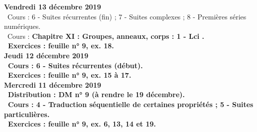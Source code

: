 \documentclass[12pt,a4paper]{article}
\begin{document}
%  
%  
%  
% 
% 
%  
% 

\noindent\textbf{Vendredi 13 décembre 2019}\\
\bu\ Cours : 6 - Suites récurrentes (fin) ; 7 - Suites complexes ; 8 - Premières séries numériques.\\
\bu\ Cours : \bf Chapitre XI \rm : Groupes, anneaux, corps  : 1 - Lci .\\ 
\bu\ Exercices : feuille n° 9, ex. 18.\vspace{.4cm}\\

\noindent\textbf{Jeudi 12 décembre 2019}\\
\bu\ Cours : 6 - Suites récurrentes (début).\\
\bu\ Exercices : feuille n° 9, ex. 15 à 17.\vspace{.4cm}\\ 
 
\noindent\textbf{\bf Mercredi 11 décembre 2019}\\
\bu\ Distribution : DM n° 9 (à rendre le 19 décembre).\\
\bu\ Cours : 4 - Traduction séquentielle de certaines propriétés ; 5 - Suites particulières.\\
\bu\ Exercices : feuille n° 9, ex. 6, 13, 14 et 19.\vspace{.4cm}\\ 
\end{document}
